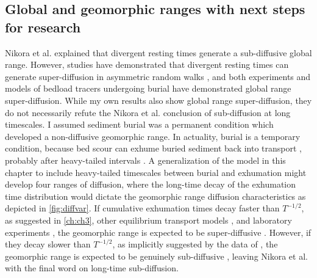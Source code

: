 \subsection{Global and geomorphic ranges with next steps for research}

Nikora et al. explained that divergent resting times generate a sub-diffusive global range.
However, studies have demonstrated that divergent resting times can generate super-diffusion in asymmetric random walks \citep{Weeks1996,Weeks1998}, and both experiments \citep{Bradley2017,Bradley2010} and models \citep{Pelosi2016,Wu2019,Wu2019a} of bedload tracers undergoing burial have demonstrated global range super-diffusion.
While my own results also show global range super-diffusion, they do not necessarily refute the Nikora et al. conclusion of sub-diffusion at long timescales.
I assumed sediment burial was a permanent condition which developed a non-diffusive geomorphic range.
In actuality, burial is a temporary condition, because bed scour can exhume buried sediment back into transport \citep{Wu2019a}, probably after heavy-tailed intervals \citep{Voepel2013,Martin2014}.
A generalization of the model in this chapter to include heavy-tailed timescales between burial and exhumation might develop four ranges of diffusion, where the long-time decay of the exhumation time distribution would dictate the geomorphic range diffusion characteristics as depicted in \DIFdelbegin {}\DIFdelend \DIFaddbegin {}\DIFaddend \ref{fig:diffvar}.
If cumulative exhumation times decay faster than $T^{-1/2}$, as suggested in \DIFdelbegin {}\DIFdelend \DIFaddbegin {}\DIFaddend \ref{ch:ch3}, other equilibrium transport models \citep{Voepel2013, Martin2014}, and laboratory experiments \citep{Martin2014,Martin2012}, the geomorphic range is expected to be super-diffusive \citep{Weeks1998}.
However, if they decay slower than $T^{-1/2}$, as implicitly suggested by the data of \citet{Olinde2015}, the geomorphic range is expected to be genuinely sub-diffusive \citep{Weeks1998}, leaving Nikora et al. with the final word on long-time sub-diffusion.

